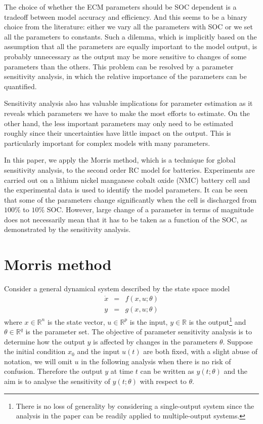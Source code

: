 \documentclass[letterpaper,twocolumn]{IEEEtran}
\begin{document}
The choice of whether the ECM parameters should be SOC dependent is a tradeoff between model accuracy and efficiency. And this seems to be a binary choice from the literature: either we vary all the parameters with SOC or we set all the parameters to constants. Such a dilemma, which is implicitly based on the assumption that all the parameters are equally important to the model output, is probably unnecessary as the output may be more sensitive to changes of some parameters than the others. This problem can be resolved by a parameter sensitivity analysis, in which the relative importance of the parameters can be quantified.

Sensitivity analysis also has valuable implications for parameter estimation as it reveals which parameters we have to make the most efforts to estimate. On the other hand, the less important parameters may only need to be estimated roughly since their uncertainties have little impact on the output. This is particularly important for complex models with many parameters.

In this paper, we apply the Morris method, which is a technique for global sensitivity analysis, to the second order RC model for batteries. Experiments are carried out on a lithium nickel manganese cobalt oxide (NMC) battery cell and the experimental data is used to identify the model parameters. It can be seen that some of the parameters change significantly when the cell is discharged from $100\%$ to $10\%$ SOC. However, large change of a parameter in terms of magnitude does not necessarily mean that it has to be taken as a function of the SOC, as demonstrated by the sensitivity analysis.



\section{Morris method}
Consider a general dynamical system described by the state space model
\begin{subequations}
\begin{eqnarray}
\dot{x} &=& f(x,u;\theta) \\
  y &=& g(x,u;\theta)
\end{eqnarray}
\end{subequations}
where $x \in \mathbb{R}^n$ is the state vector, $u \in \mathbb{R}^p$ is the input, $y \in \mathbb{R}$ is the output\footnote{There is no loss of generality by considering a single-output system since the analysis in the paper can be readily applied to multiple-output systems.} and $\theta \in \mathbb{R}^{q}$ is the parameter set. The objective of parameter sensitivity analysis is to determine how the output $y$ is affected by changes in the parameters $\theta$. Suppose the initial condition $x_0$ and the input $u(t)$ are both fixed, with a slight abuse of notation, we will omit $u$ in the following analysis when there is no risk of confusion. Therefore the output $y$ at time $t$ can be written as $y(t;\theta)$ and the aim is to analyse the sensitivity of $y(t;\theta)$ with respect to $\theta$.
\end{document}
